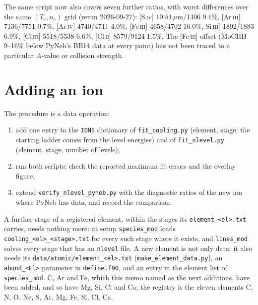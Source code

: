 \documentclass[english,a4paper]{my_memo}
\newcommand{\code}[1]{\texttt{#1}}
\begin{document}
The same script now also covers seven further ratios, with worst
differences over the same $(T_e, n_e)$ grid (rerun 2026-09-27):
[S\,\textsc{iv}] $10.51\,\mu$m/1406 $9.1\%$, [Ar\,\textsc{iii}] 7136/7751
$0.7\%$, [Ar\,\textsc{iv}] 4740/4711 $4.0\%$, [Fe\,\textsc{iii}] 4658/4702
$16.0\%$, Si\,\textsc{iii}] 1892/1883 $6.9\%$, [Cl\,\textsc{iii}]
5518/5538 $6.6\%$, [Cl\,\textsc{ii}] 8579/9124 $1.5\%$.  The
[Fe\,\textsc{iii}] offset (MoCHII 9--16\% below PyNeb's BB14 data at every
point) has not been traced to a particular $A$-value or collision
strength.

\section{Adding an ion}
The procedure is a data operation:
\begin{enumerate}
\item add one entry to the \code{IONS} dictionary of \code{fit\_cooling.py}
  (element, stage; the starting ladder comes from the level energies) and
  of \code{fit\_nlevel.py} (element, stage, number of levels);
\item run both scripts; check the reported maximum fit errors and the
  overlay figure;
\item extend \code{verify\_nlevel\_pyneb.py} with the diagnostic ratios
  of the new ion where PyNeb has data, and record the comparison.
\end{enumerate}
A further stage of a registered element, within the stages its
\code{element\_<el>.txt} carries, needs nothing more: at setup
\code{species\_mod} loads \code{cooling\_<el>\_<stage>.txt} for every
such stage where it exists, and \code{lines\_mod} solves every stage that has
an \code{nlevel} file.  A new element is not only data: it also needs its
\code{data/atomic/element\_<el>.txt} (\code{make\_element\_data.py}), an
\code{abund\_<El>} parameter in \code{define.f90}, and an entry in the
element list of \code{species\_mod}.  C, Ar and Fe, which this memo
named as the next additions, have been added, and so have Mg, Si, Cl and
Ca; the registry is the eleven elements C, N, O, Ne, S, Ar, Mg, Fe, Si, Cl,
Ca.
\end{document}
